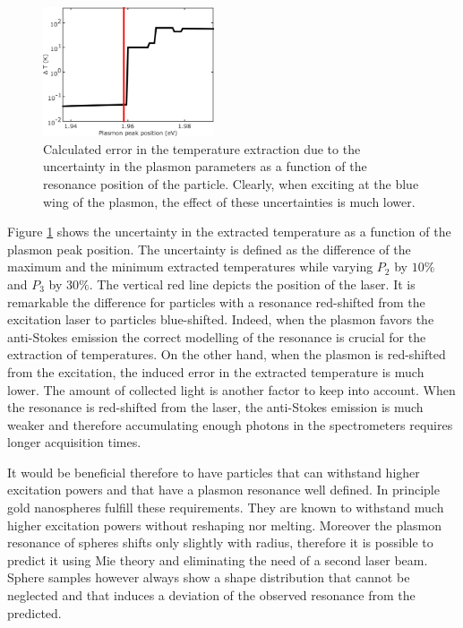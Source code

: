 \begin{figure}[htp] \centering
\includegraphics[width=0.45\textwidth]{Chapters/04_Anti-Stokes/Figures/06_Calculation_error/06_calculation_error.png}
\caption{Calculated error in the temperature extraction due to the uncertainty
in the plasmon parameters as a function of the resonance position of the
particle. Clearly, when exciting at the blue wing of the plasmon, the effect of
these uncertainties is much lower.}
	\label{fig:calculated-error}
\end{figure}

Figure \ref{fig:calculated-error} shows the uncertainty in the extracted
temperature as a function of the plasmon peak position. The uncertainty is
defined as the difference of the maximum and the minimum extracted temperatures
while varying $P_2$ by $10\%$ and $P_3$ by $30\%$. The vertical red line depicts
the position of the laser. It is remarkable the difference for particles with a
resonance red-shifted from the excitation laser to particles blue-shifted.
Indeed, when the plasmon favors the anti-Stokes emission the correct modelling
of the resonance is crucial for the extraction of temperatures. On the other
hand, when the plasmon is red-shifted from the excitation, the induced error in
the extracted temperature is much lower. The amount of collected light is
another factor to keep into account. When the resonance is red-shifted
from the laser, the anti-Stokes emission is much weaker and therefore
accumulating enough photons in the spectrometers requires longer acquisition
times.


It would be beneficial therefore to have particles that can withstand higher
excitation powers and that have a plasmon resonance well defined. In principle
gold nanospheres fulfill these requirements. They are known to withstand much
higher excitation powers without reshaping nor melting\cite{Hou2015}. Moreover
the plasmon resonance of spheres shifts only slightly with radius, therefore it
is possible to predict it using Mie theory and eliminating the need of a second
laser beam. Sphere samples however always show a shape distribution that cannot
be neglected and that induces a deviation of the observed resonance from the
predicted.

